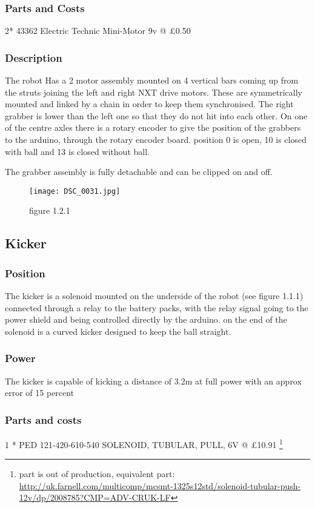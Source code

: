 \subsubsection{Parts and Costs}
2* 43362 Electric Technic Mini-Motor 9v @ £0.50 

\subsubsection{Description}
The robot Has a 2 motor assembly mounted on 4 vertical bars coming up from the struts joining the left and right NXT drive motors. These are symmetrically mounted and linked by a chain in order to keep them synchronised. The right grabber is lower than the left one so that they do not hit into each other. On one of the centre axles there is a rotary encoder to give the position of the grabbers to the arduino, through the rotary encoder board. position 0 is open, 10 is closed with ball and 13 is closed without ball.

The grabber assembly is fully detachable and can be clipped on and off. 
\begin{figure}[!ht]
\caption{figure 1.2.1}
\centering
\texttt{[image: DSC\_0031.jpg]}
\end{figure}

\subsection{Kicker}
\subsubsection{Position}
The kicker is a solenoid mounted on the underside of the robot (see figure 1.1.1) connected through a relay to the battery packs, with the relay signal going to the power shield and being controlled directly by the arduino. on the end of the solenoid is a curved kicker designed to keep the ball straight.

\subsubsection{Power}
The kicker is capable of kicking a distance of 3.2m at full power with an approx error of 15 percent

\subsubsection{Parts and costs}
1 * PED 	121-420-610-540  SOLENOID, TUBULAR, PULL, 6V @ £10.91
\footnote{part is out of production, equivalent part: \url{http://uk.farnell.com/multicomp/mcsmt-1325s12std/solenoid-tubular-push-12v/dp/2008785?CMP=ADV-CRUK-LF}}

